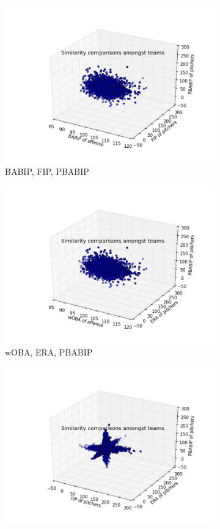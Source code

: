 \documentclass[12pt]{article}
\numberwithin{equation}{subsection}
\begin{document}
\begin{figure}[H]
  \begin{subfigure}[b]{0.33\linewidth}
    \centering
    \includegraphics[width=0.9\linewidth]{Sim4} 
    \caption{BABIP, FIP, PBABIP} 
    \label{fig5:d} 
  \end{subfigure}%
  \begin{subfigure}[b]{0.33\linewidth}
    \centering
    \includegraphics[width=0.9\linewidth]{Sim5} 
    \caption{wOBA, ERA, PBABIP} 
    \label{fig5:e} 
   \end{subfigure}
  \begin{subfigure}[b]{0.33\linewidth}
    \centering
    \includegraphics[width=0.9\linewidth]{Sim6} 

\end{subfigure}
\end{figure}
\end{document}
